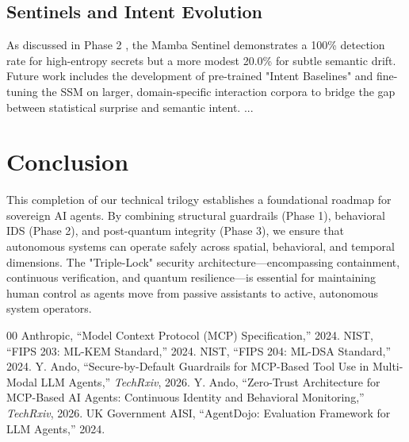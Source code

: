 \documentclass[conference]{IEEEtran}
\begin{document}
\subsection{Sentinels and Intent Evolution}
As discussed in Phase 2 \cite{ando2026zerotrust}, the Mamba Sentinel demonstrates a 100\% detection rate for high-entropy secrets but a more modest 20.0\% for subtle semantic drift. Future work includes the development of pre-trained "Intent Baselines" and fine-tuning the SSM on larger, domain-specific interaction corpora to bridge the gap between statistical surprise and semantic intent.
...
\section{Conclusion}
This completion of our technical trilogy establishes a foundational roadmap for sovereign AI agents. By combining structural guardrails (Phase 1), behavioral IDS (Phase 2), and post-quantum integrity (Phase 3), we ensure that autonomous systems can operate safely across spatial, behavioral, and temporal dimensions. The "Triple-Lock" security architecture—encompassing containment, continuous verification, and quantum resilience—is essential for maintaining human control as agents move from passive assistants to active, autonomous system operators.

\begin{thebibliography}{00}
 Anthropic, ``Model Context Protocol (MCP) Specification,'' 2024.
 NIST, ``FIPS 203: ML-KEM Standard,'' 2024.
 NIST, ``FIPS 204: ML-DSA Standard,'' 2024.
 Y. Ando, ``Secure-by-Default Guardrails for MCP-Based Tool Use in Multi-Modal LLM Agents,'' \textit{TechRxiv}, 2026.
 Y. Ando, ``Zero-Trust Architecture for MCP-Based AI Agents: Continuous Identity and Behavioral Monitoring,'' \textit{TechRxiv}, 2026.
 UK Government AISI, ``AgentDojo: Evaluation Framework for LLM Agents,'' 2024.
\end{thebibliography}
\end{document}
